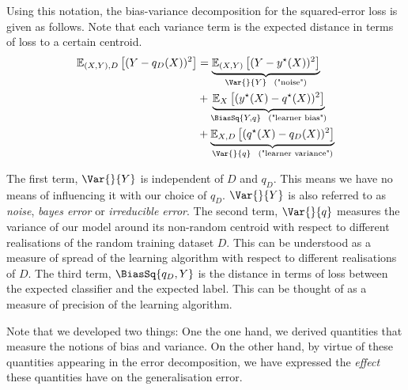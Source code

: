 \documentclass[
    a4paper, %
	fontsize=10pt, %
	twoside=false, %
]{kaobook}
\begin{document}
Using this notation, the bias-variance decomposition for the squared-error loss is given as follows.
Note that each variance term is the expected distance in terms of loss to a certain centroid.
\begin{align} \label{thm:sqerr-bias-variance-decomp}
\mathbb{E}_{(X,Y), D}\left[ (Y-q_{D}(X))^2 \right]  
&= \underbrace{\mathbb{E}_{(X,Y)}\left[ (Y-y^\star(X))^2 \right]   }_{\Var{}{Y} ~~ \text{("noise")}} \\
&+ \underbrace{ \mathbb{E}_{X}\left[  (y^\star(X) - q^\star(X))^2\right]  }_{\BiasSq{Y, q} ~~ \text{("learner bias")}} \\
&+ \underbrace{\mathbb{E}_{X, D}\left[ (q^\star(X) - q_{D}(X))^2 \right]   }_{\Var{}{q} ~~ \text{("learner variance")}}
\end{align}

The first term, $\Var{}{Y}$ is independent of $D$ and $q_{D}$. This means we have no means of influencing it with our choice of $q_{D}$.
$\Var{}{Y}$ is also referred to as \textit{noise}, \textit{bayes error} or \textit{irreducible error}. 
The second term, $\Var{}{q}$ measures the variance of our model around its non-random centroid with respect to different realisations of the random training dataset $D$. This can be understood as a measure of spread of the learning algorithm with respect to different realisations of $D$.
The third term, $\BiasSq{q_{D}, Y}$ is the distance in terms of loss between the expected classifier and the expected label. This can be thought of as a measure of precision of the learning algorithm. 

Note that we developed two things:
One the one hand, we derived quantities that measure the notions of bias and variance. On the other hand, by virtue of these quantities appearing in the error decomposition, we have expressed the \textit{effect} these quantities have on the generalisation error.
\end{document}
